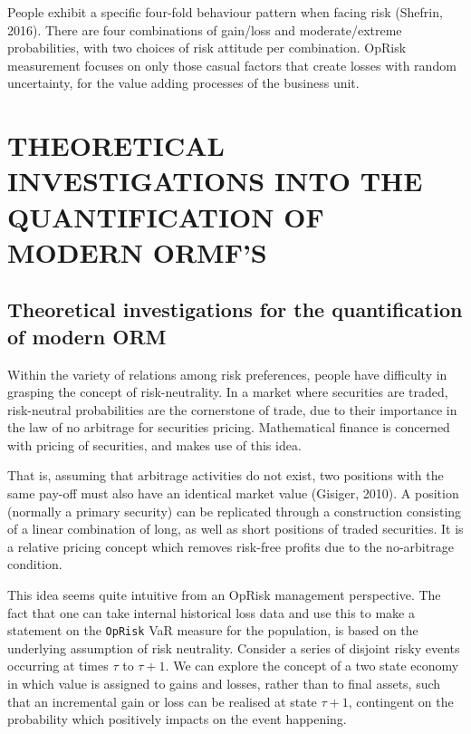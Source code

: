 \documentclass[]{DissertateUSU}
\begin{document}
People exhibit a specific four-fold behaviour pattern when facing risk
(Shefrin, 2016). There are four combinations of gain/loss and
moderate/extreme probabilities, with two choices of risk attitude per
combination. OpRisk measurement focuses on only those casual factors
that create losses with random uncertainty, for the value adding
processes of the business unit.

\singlespacing

\FloatBarrier
\newpage
{}
\fancyhead[R]{\thepage} \fancyfoot[C]{}

\chapter{THEORETICAL INVESTIGATIONS INTO THE QUANTIFICATION OF MODERN ORMF'S}

\doublespacing

\section{Theoretical investigations for the quantification of modern ORM}

Within the variety of relations among risk preferences, people have
difficulty in grasping the concept of risk-neutrality. In a market where
securities are traded, risk-neutral probabilities are the cornerstone of
trade, due to their importance in the law of no arbitrage for securities
pricing. Mathematical finance is concerned with pricing of securities,
and makes use of this idea.\medskip

That is, assuming that arbitrage activities do not exist, two positions
with the same pay-off must also have an identical market value (Gisiger,
2010). A position (normally a primary security) can be replicated
through a construction consisting of a linear combination of long, as
well as short positions of traded securities. It is a relative pricing
concept which removes risk-free profits due to the no-arbitrage
condition.\medskip

This idea seems quite intuitive from an OpRisk management perspective.
The fact that one can take internal historical loss data and use this to
make a statement on the \texttt{OpRisk} VaR measure for the population,
is based on the underlying assumption of risk neutrality. Consider a
series of disjoint risky events occurring at times \(\tau\) to
\(\tau + 1\). We can explore the concept of a two state economy in which
value is assigned to gains and losses, rather than to final assets, such
that an incremental gain or loss can be realised at state \(\tau + 1\),
contingent on the probability which positively impacts on the event
happening.\medskip
\end{document}
